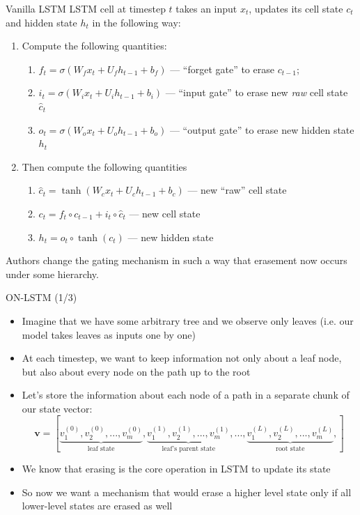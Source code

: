 \documentclass[handout, 10pt]{beamer}
\begin{document}
\begin{frame}{Vanilla LSTM}
\pause
LSTM cell at timestep $t$ takes an input $x_t$, updates its cell state $c_t$ and hidden state $h_t$ in the following way:
\begin{enumerate}
    \item\pause Compute the following quantities:
    \begin{enumerate}
        \item\pause $f_{t}=\sigma\left(W_{f} x_{t}+U_{f} h_{t-1}+b_{f}\right)$ --- ``forget gate'' to erase $c_{t-1}$;
        \item\pause $i_{t}=\sigma\left(W_{i} x_{t}+U_{i} h_{t-1}+b_{i}\right)$ --- ``input gate'' to erase new \textit{raw} cell state $\hat{c}_t$
        \item\pause $o_{t}=\sigma\left(W_{o} x_{t}+U_{o} h_{t-1}+b_{o}\right)$ --- ``output gate'' to erase new hidden state $h_t$
    \end{enumerate}
    \item\pause Then compute the following quantities
    \begin{enumerate}
        \item\pause $\hat{c}_{t}=\tanh \left(W_{c} x_{t}+U_{c} h_{t-1}+b_{c}\right)$ --- new ``raw'' cell state
        \item\pause $c_t = f_t \circ c_{t-1} + i_t \circ \hat c_t$ --- new cell state
        \item\pause $h_{t}=o_{t} \circ \tanh \left(c_{t}\right)$ --- new hidden state
    \end{enumerate}
\end{enumerate}

\pause
Authors change the gating mechanism in such a way that erasement now occurs under some hierarchy.
\end{frame}


\begin{frame}{ON-LSTM (1/3)}
\begin{itemize}
    \item\pause Imagine that we have some arbitrary tree and we observe only leaves (i.e. our model takes leaves as inputs one by one)
    \item\pause At each timestep, we want to keep information not only about a leaf node, but also about every node on the path up to the root
    \item\pause Let's store the information about each node of a path in a separate chunk of our state vector:
    \begin{equation*}
        \bm v = [
        \underbrace{v_1^{(0)}, v_2^{(0)}, ..., v_m^{(0)}}_\text{leaf state},
        \underbrace{v_1^{(1)}, v_2^{(1)}, ..., v_m^{(1)}}_\text{leaf's parent state},
        ...,
        \underbrace{v_1^{(L)}, v_2^{(L)}, ..., v_m^{(L)}}_\text{root state},
        ]
    \end{equation*}
    \item\pause We know that erasing is the core operation in LSTM to update its state
    \item\pause So now we want a mechanism that would erase a higher level state only if all lower-level states are erased as well
\end{itemize}
\end{frame}
\end{document}
